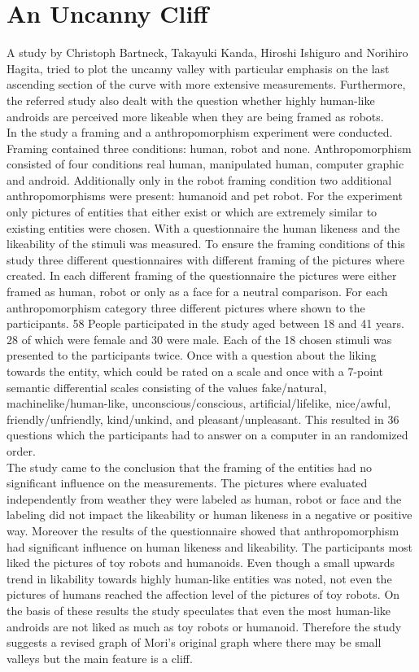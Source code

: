 \section{An Uncanny Cliff}
A study by Christoph Bartneck, Takayuki Kanda, Hiroshi Ishiguro and Norihiro Hagita, tried to plot the uncanny valley with particular emphasis on the last ascending section of the curve with more extensive measurements. Furthermore, the referred study also dealt with the question whether highly human-like androids are perceived more likeable when they are being framed as robots. \cite{uncanny_cliff}\\
In the study a framing and a anthropomorphism experiment were conducted. Framing contained three conditions: human, robot and none. Anthropomorphism consisted of four conditions real human, manipulated human, computer graphic and android. Additionally only in the robot framing condition two additional anthropomorphisms were present: humanoid and pet robot. For the experiment only pictures of entities that either exist or which are extremely similar to existing entities were chosen. 
With a questionnaire the human likeness and the likeability of the stimuli was measured.
To ensure the framing conditions of this study three different questionnaires with different framing of the pictures where created. In each different framing of the questionnaire the pictures were either framed as human, robot or only as a face for a neutral comparison. For each anthropomorphism category three different pictures where shown to the participants. 
58 People participated in the study aged between 18 and 41 years. 28 of which were female and 30 were male.
Each of the 18 chosen stimuli was presented to the participants twice. Once with a question about the liking towards the entity, which could be rated on a scale and once with a 7-point semantic differential scales consisting of the values fake/natural, machinelike/human-like, unconscious/conscious, artificial/lifelike, nice/awful, friendly/unfriendly, kind/unkind, and pleasant/unpleasant. This resulted in 36 questions which the participants had to answer on a computer in an randomized order. \cite{uncanny_cliff}\\
The study came to the conclusion that the framing of the entities had no significant influence on the measurements. The pictures where evaluated independently from weather they were labeled as human, robot or face and the labeling did not impact the likeability or human likeness in a negative or positive way.
Moreover the results of the questionnaire showed that anthropomorphism had significant influence on human likeness and likeability. The participants most liked the pictures of toy robots and humanoids. Even though a small upwards trend in likability towards highly human-like entities was noted, not even the pictures of humans reached the affection level of the pictures of toy robots. On the basis of these results the study speculates that even the most human-like androids are not liked as much as toy robots or humanoid. Therefore the study suggests a revised graph of Mori's original graph where there may be small valleys but the main feature is a cliff.
